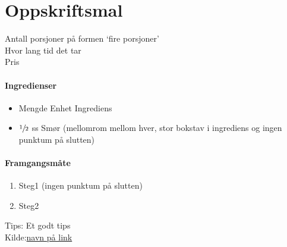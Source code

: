 \section{Oppskriftsmal}
\label{oppskrifsmal}

Antall porsjoner på formen `fire porsjoner'\\
Hvor lang tid det tar\\
Pris

\paragraph{Ingredienser}
\begin{itemize}[noitemsep]
	\item Mengde Enhet Ingrediens
	\item $\sfrac{1}{2}$ ss Smør (mellomrom mellom hver, stor bokstav i ingrediens og ingen punktum på slutten)
\end{itemize}

\paragraph{Framgangsmåte}
\begin{enumerate}[noitemsep]
	\item Steg1 (ingen punktum på slutten)
	\item Steg2
\end{enumerate}

Tips: Et godt tips \\

Kilde:\href{https://link}{navn på link}
